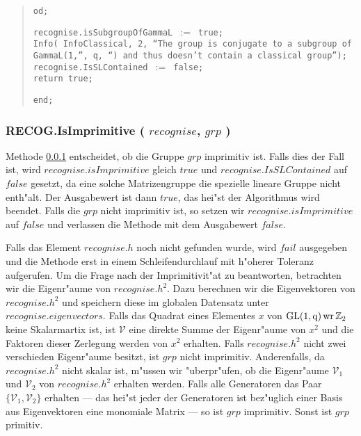 \documentclass[a4paper,11pt]{article}
\theoremstyle{bla}
\begin{document}
\begin{quote}
  \texttt{od;}

  \texttt{recognise.isSubgroupOfGammaL $:=$ true;}\\
  \texttt{Info( InfoClassical, 2, ``The group is conjugate to a subgroup of}\\
  \texttt{GammaL(1,'', q, ``) and thus doesn't contain a classical group'');}\\
  \texttt{recognise.IsSLContained $:=$ false;}\\
  \texttt{return true;}

\hspace*{-0.3cm} \texttt{end;}
\end{quote}


\subsubsection{RECOG.IsImprimitive ( $recognise$, $grp$ )}\label{imprimitiv}

 Methode \ref{imprimitiv} entscheidet, ob die Gruppe $grp$ imprimitiv ist. Falls dies der Fall ist, wird $recognise.isImprimitive$ gleich $true$ und $recognise.IsSLContained$ auf $false$ gesetzt, da eine solche Matrizengruppe die spezielle lineare Gruppe nicht enth"alt. Der Ausgabewert ist dann $true$, das hei"st der Algorithmus wird beendet. Falls die $grp$ nicht imprimitiv ist, so setzen wir $recognise.isImprimitive$ auf $false$ und verlassen die Methode mit dem Ausgabewert $false$.

 Falls das Element $recognise.h$ noch nicht gefunden wurde, wird $fail$ ausgegeben und die Methode erst in einem Schleifendurchlauf mit h"oherer Toleranz aufgerufen. Um die Frage nach der Imprimitivit"at zu beantworten, betrachten wir die Eigenr"aume von $recognise.h^2$. Dazu berechnen wir die Eigenvektoren von $recognise.h^2$ und speichern diese im globalen Datensatz unter $recognise.eigenvectors$. Falls das Quadrat eines Elementes $x$ von $\rm{GL}(1,q) \,\rm{ wr }\, \mathbb{Z}_{2}$ keine Skalarmartix ist, ist $\mathcal{V}$ eine direkte Summe der Eigenr"aume von $x^2$ und die Faktoren dieser Zerlegung werden von $x^2$ erhalten.
 Falls $recognise.h^2$ nicht zwei verschieden Eigenr"aume besitzt, ist $grp$ nicht imprimitiv. Anderenfalls, da $recognise.h^2$ nicht skalar ist, m"ussen wir "uberpr"ufen, ob die Eigenr"aume $\mathcal{V}_1$ und $\mathcal{V}_2$ von $recognise.h^2$ erhalten werden. Falls alle Generatoren das Paar $\{ \mathcal{V}_{1}, \mathcal{V}_{2}\}$ erhalten --- das hei"st jeder der Generatoren ist bez"uglich einer Basis aus Eigenvektoren eine monomiale Matrix --- so ist $grp$ imprimitiv. Sonst ist $grp$ primitiv.
\end{document}
